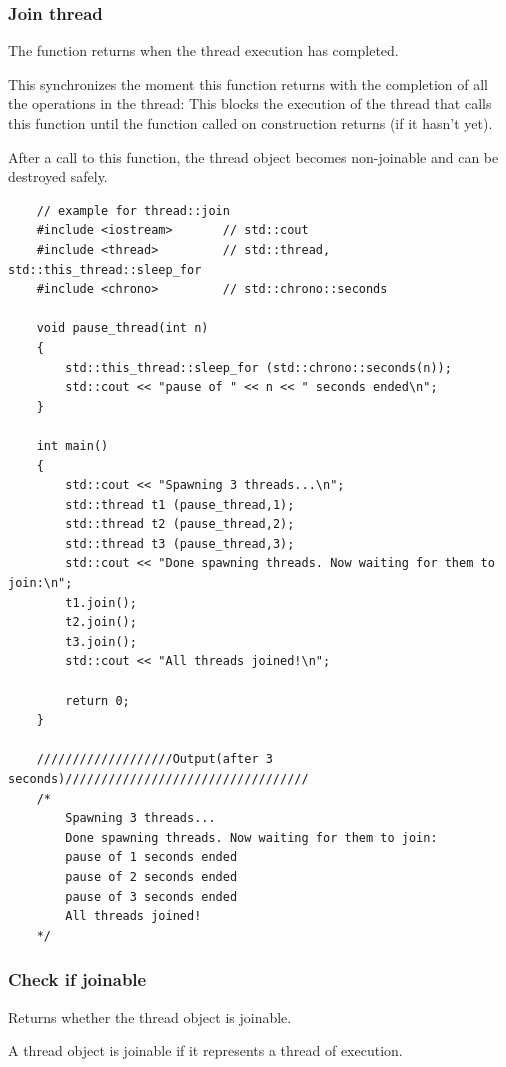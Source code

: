 \documentclass[UTF8,a4paper,12pt]{ctexbook}
\begin{document}
		\subsubsection{Join thread}The function returns when the thread execution has completed.
		
		This synchronizes the moment this function returns with the completion of all the operations in the thread: This blocks the execution of the thread that calls this function until the function called on construction returns (if it hasn't yet).
		
		After a call to this function, the thread object becomes non-joinable and can be destroyed safely.
\begin{lstlisting}
	// example for thread::join
	#include <iostream>       // std::cout
	#include <thread>         // std::thread, std::this_thread::sleep_for
	#include <chrono>         // std::chrono::seconds
	
	void pause_thread(int n) 
	{
		std::this_thread::sleep_for (std::chrono::seconds(n));
		std::cout << "pause of " << n << " seconds ended\n";
	}
	
	int main() 
	{
		std::cout << "Spawning 3 threads...\n";
		std::thread t1 (pause_thread,1);
		std::thread t2 (pause_thread,2);
		std::thread t3 (pause_thread,3);
		std::cout << "Done spawning threads. Now waiting for them to join:\n";
		t1.join();
		t2.join();
		t3.join();
		std::cout << "All threads joined!\n";
		
		return 0;
	}

	///////////////////Output(after 3 seconds)//////////////////////////////////
	/*
		Spawning 3 threads...
		Done spawning threads. Now waiting for them to join:
		pause of 1 seconds ended
		pause of 2 seconds ended
		pause of 3 seconds ended
		All threads joined!
	*/	
\end{lstlisting}
		\subsubsection{Check if joinable}Returns whether the thread object is joinable.
		
		A thread object is joinable if it represents a thread of execution.
		
\end{document}

